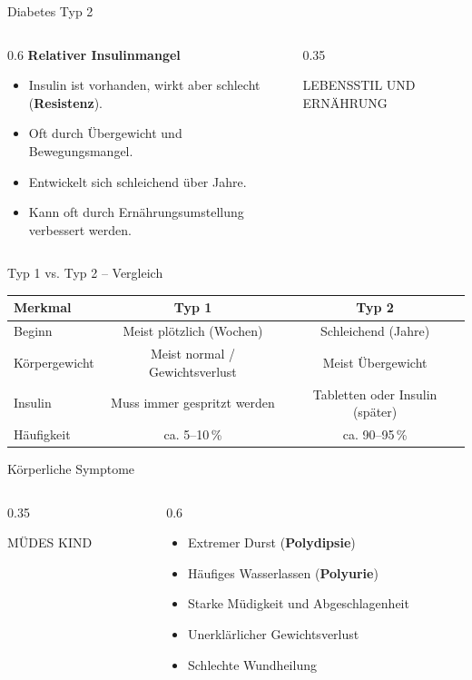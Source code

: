 \documentclass[10pt, aspectratio=169]{beamer}
\newcommand{\imagebox}[2]{%
	\begin{tcolorbox}[enhanced, colback=white, colframe=KitaBlue!20, arc=3mm, width=\textwidth, height=#1, valign=center, halign=center]
		\centering
		\vspace{0.5em}
		\scriptsize \color{KitaBlue!60} \MakeUppercase{#2}
	\end{tcolorbox}
}
\begin{document}
	\begin{frame}{Diabetes Typ 2}
		\begin{columns}
			\begin{column}{0.6\textwidth}
				\textbf{Relativer Insulinmangel}
				\begin{itemize}
					\item Insulin ist vorhanden, wirkt aber schlecht (\textbf{Resistenz}).
					\item Oft durch Übergewicht und Bewegungsmangel.
					\item Entwickelt sich schleichend über Jahre.
					\item Kann oft durch Ernährungsumstellung verbessert werden.
				\end{itemize}
			\end{column}
			\begin{column}{0.35\textwidth}
				\imagebox{4.5cm}{Lebensstil und Ernährung}
			\end{column}
		\end{columns}
	\end{frame}
	
	\begin{frame}{Typ 1 vs. Typ 2 – Vergleich}
		\begin{table}
			\centering
			\begin{tabular}{@{}lcc@{}}
				\toprule
				\textbf{Merkmal} & \textbf{Typ 1} & \textbf{Typ 2} \\
				\midrule
				Beginn & Meist plötzlich (Wochen) & Schleichend (Jahre) \\
				Körpergewicht & Meist normal / Gewichtsverlust & Meist Übergewicht \\
				Insulin & Muss immer gespritzt werden & Tabletten oder Insulin (später) \\
				Häufigkeit & ca. 5–10\,\% & ca. 90–95\,\% \\
				\bottomrule
			\end{tabular}
		\end{table}
	\end{frame}
	
	\begin{frame}{Körperliche Symptome}
		\begin{columns}
			\begin{column}{0.35\textwidth}
				\imagebox{4.5cm}{Müdes Kind}
			\end{column}
			\begin{column}{0.6\textwidth}
				\begin{itemize}
					\item Extremer Durst (\textbf{Polydipsie})
					\item Häufiges Wasserlassen (\textbf{Polyurie})
					\item Starke Müdigkeit und Abgeschlagenheit
					\item Unerklärlicher Gewichtsverlust
					\item Schlechte Wundheilung
				\end{itemize}
			\end{column}
		\end{columns}
	\end{frame}
	
\end{document}
